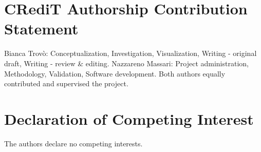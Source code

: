 \documentclass[runningheads]{llncs}
\begin{document}
\section{CRediT Authorship Contribution Statement}
Bianca Trovò: Conceptualization, Investigation, Visualization, Writing - original draft, Writing - review \& editing. Nazzareno Massari: Project administration, Methodology, Validation, Software development. Both authors equally contributed and supervised the project.
\section{Declaration of Competing Interest}
The authors declare no competing interests.

%
%


\end{document}

